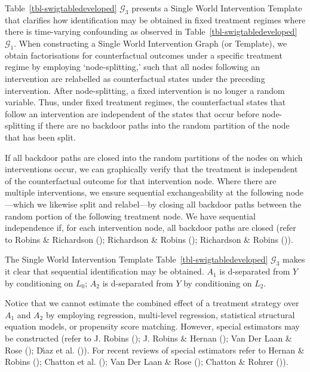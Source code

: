 \documentclass[
  single column]{article}
\begin{document}
Table~\ref{tbl-swigtabledeveloped} \(\mathcal{G}_3\) presents a Single
World Intervention Template that clarifies how identification may be
obtained in fixed treatment regimes where there is time-varying
confounding as observed in Table~\ref{tbl-swigtabledeveloped}
\(\mathcal{G}_1\). When constructing a Single World Intervention Graph
(or Template), we obtain factorisations for counterfactual outcomes
under a specific treatment regime by employing `node-splitting,' such
that all nodes following an intervention are relabelled as
counterfactual states under the preceding intervention. After
node-splitting, a fixed intervention is no longer a random variable.
Thus, under fixed treatment regimes, the counterfactual states that
follow an intervention are independent of the states that occur before
node-splitting if there are no backdoor paths into the random partition
of the node that has been split.

If all backdoor paths are closed into the random partitions of the nodes
on which interventions occur, we can graphically verify that the
treatment is independent of the counterfactual outcome for that
intervention node. Where there are multiple interventions, we ensure
sequential exchangeability at the following node---which we likewise
split and relabel---by closing all backdoor paths between the random
portion of the following treatment node. We have sequential independence
if, for each intervention node, all backdoor paths are closed (refer to
Robins \& Richardson ();
Richardson \& Robins ();
Richardson \& Robins ()).

The Single World Intervention Template
Table~\ref{tbl-swigtabledeveloped} \(\mathcal{G}_3\) makes it clear that
sequential identification may be obtained. \(A_1\) is d-separated from
\(Y\) by conditioning on \(L_0\); \(A_2\) is d-separated from \(Y\) by
conditioning on \(L_2\).

Notice that we cannot estimate the combined effect of a treatment
strategy over \(A_1\) and \(A_2\) by employing regression, multi-level
regression, statistical structural equation models, or propensity score
matching. However, special estimators may be constructed (refer to J.
Robins (); J. Robins \& Hernan
(); Van Der Laan \& Rose
(); Dı́az et al.
()). For recent reviews of
special estimators refer to Hernan \& Robins
(); Chatton et al.
(); Van Der Laan \& Rose
(); Chatton \& Rohrer
()).
\end{document}

